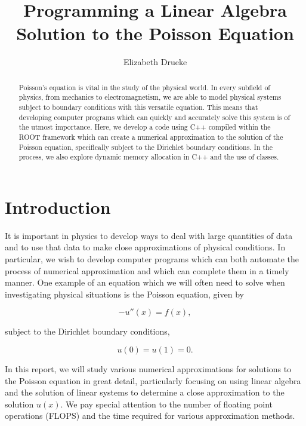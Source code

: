 \documentclass[12pt]{article}
\title{Programming a Linear Algebra Solution to the Poisson Equation}
\author{Elizabeth Drueke}
\numberwithin{equation}{section}
\begin{document}
\maketitle

\begin{abstract}
Poisson's equation is vital in the study of the physical world.  In every subfield of physics, from mechanics to electromagnetism, we are able to model physical systems subject to boundary conditions with this versatile equation.  This means that developing computer programs which can quickly and accurately solve this system is of the utmost importance.  Here, we develop a code using C++ compiled within the ROOT framework which can create a numerical approximation to the solution of the Poisson equation, specifically subject to the Dirichlet boundary conditions.  In the process, we also explore dynamic memory allocation in C++ and the use of classes.
\end{abstract}

\section{Introduction}
\label{sec:into}
It is important in physics to develop ways to deal with large quantities of data and to use that data to make close approximations of physical conditions.  In particular, we wish to develop computer programs which can both automate the process of numerical approximation and which can complete them in a timely manner.  One example of an equation which we will often need to solve when investigating physical situations is the Poisson equation, given by 

\begin{equation}
\label{eq:poisson}
-u''\left(x\right) = f\left(x\right),
\end{equation}

\noindent subject to the Dirichlet boundary conditions,

\begin{equation}
\label{eq:dirichlet}
u\left(0\right)=u\left(1\right)=0.
\end{equation}

In this report, we will study various numerical approximations for solutions to the Poisson equation in great detail, particularly focusing on using linear algebra and the solution of linear systems to determine a close approximation to the solution $u\left(x\right)$.  We pay special attention to the number of floating point operations (FLOPS) and the time required for various approximation methods.
\end{document}
